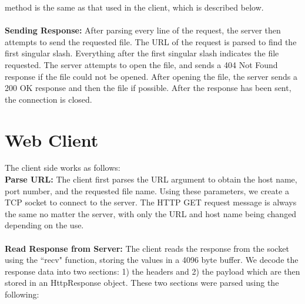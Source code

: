 \documentclass{article}
\begin{document}
        method is the same as that used in the client, which is described
        below. \\ \\
    \textbf{Sending Response:}
        After parsing every line of the request, the server then attempts to
        send the requested file. The URL of the request is parsed to find the
        first singular slash. Everything after the first singular slash
        indicates the file requested. The server attempts to open the file, and
        sends a 404 Not Found response if the file could not be opened. After
        opening the file, the server sends a 200 OK response and then the file
        if possible. After the response has been sent, the connection is
        closed.

\section{Web Client}
    The client side works as follows: \\
    \textbf{Parse URL:}
        The client first parses the URL argument to obtain the host name, port
        number, and the requested file name. Using these parameters, we create
        a TCP socket to connect to the server. The HTTP GET request message is
        always the same no matter the server, with only the URL and host name
        being changed depending on the use. \\ \\
    \textbf{Read Response from Server:}
        The client reads the response from the socket using the ``recv"
        function, storing the values in a 4096 byte buffer. We decode the
        response data into two sections: 1) the headers and 2) the payload
        which are then stored in an HttpResponse object. These two sections
        were parsed using the following:
\end{document}
